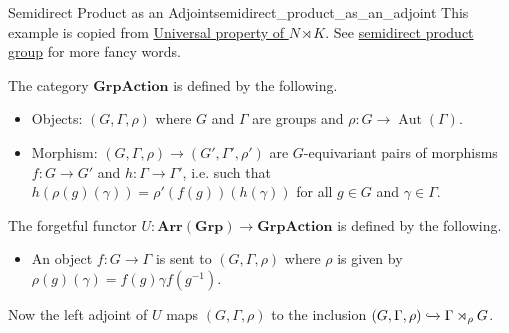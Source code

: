 \documentclass{article}
\begin{document}
\begin{example}{Semidirect Product as an Adjoint}{semidirect_product_as_an_adjoint}
    This example is copied from \href{https://math.stackexchange.com/questions/284315/universal-property-of-n-rtimes-k}{Universal property of $N\rtimes K$}.
    See \href{https://ncatlab.org/nlab/show/semidirect+product+group#as_a_left_adjoint}{semidirect product group} for more fancy words.
    \par
    The category $\mathbf{GrpAction}$ is defined by the following.
    \begin{itemize}
        \item Objects: $(G, \Gamma, \rho)$ where $G$ and $\Gamma$ are groups and $\rho: G\rightarrow \operatorname{Aut}(\Gamma)$.
        \item Morphism: $(G,\Gamma,\rho) \rightarrow (G',\Gamma',\rho')$ are $G$-equivariant pairs of morphisms $f: G\rightarrow G'$ and $h: \Gamma\rightarrow \Gamma'$,
        i.e. such that $h(\rho(g)(\gamma)) = \rho'(f(g))(h(\gamma))$ for all $g\in G$ and $\gamma\in \Gamma$.
    \end{itemize}
    The forgetful functor $U: \mathbf{Arr}(\mathbf{Grp}) \rightarrow \mathbf{GrpAction}$ is defined by the following.
    \begin{itemize}
        \item An object $f: G\rightarrow \Gamma$ is sent to $(G,\Gamma,\rho)$ where $\rho$ is given by $\rho(g)(\gamma) = f(g)\gamma f(g^{-1})$.
    \end{itemize}
    Now the left adjoint of $U$ maps $(G,\Gamma,\rho)$ to the inclusion $(G,\Gamma,\rho)\xhookrightarrow{} \Gamma \rtimes_\rho G$.
\end{example}
\end{document}

